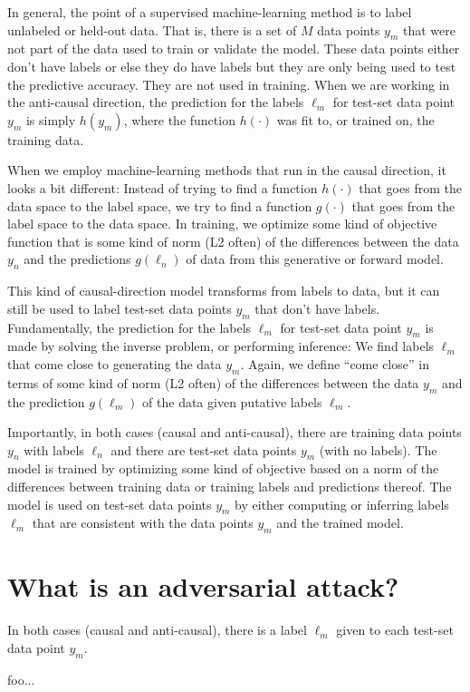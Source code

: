 \documentclass[12pt, letterpaper]{article}
\begin{document}
In general, the point of a supervised machine-learning method is to
label unlabeled or held-out data.
That is, there is a set of $M$ data points $y_m$ that were not part of
the data used to train or validate the model.
These data points either don't have labels or else they do have labels
but they are only being used to test the predictive accuracy.
They are not used in training.
When we are working in the anti-causal direction, the prediction for
the labels $\ell_m$ for test-set data point $y_m$ is simply $h(y_m)$,
where the function $h(\cdot)$ was fit to, or trained on, the training
data.

When we employ machine-learning methods that run in the causal
direction, it looks a bit different:
Instead of trying to find a function $h(\cdot)$ that goes from the
data space to the label space, we try to find a function $g(\cdot)$
that goes from the label space to the data space.
In training, we optimize some kind of objective function
that is some kind of norm (L2 often) of the differences
between the data $y_n$ and the predictions $g(\ell_n)$ of data
from this generative or forward model.

This kind of causal-direction model transforms from labels to data,
but it can still be used to label test-set data points $y_m$ that
don't have labels.
Fundamentally, the prediction for the labels $\ell_m$ for test-set
data point $y_m$ is made by solving the inverse problem, or performing
inference:
We find labels $\ell_m$ that come close to generating the data $y_m$.
Again, we define ``come close'' in terms of some kind of norm (L2
often) of the differences between the data $y_m$ and the prediction
$g(\ell_m)$ of the data given putative labels $\ell_m$.

Importantly, in both cases (causal and anti-causal), there are training
data points $y_n$ with labels $\ell_n$ and there are test-set data points
$y_m$ (with no labels).
The model is trained by optimizing some kind of objective based on a
norm of the differences between training data or training labels and
predictions thereof.
The model is used on test-set data points $y_m$ by either computing or
inferring labels $\ell_m$ that are consistent with the data points
$y_m$ and the trained model.

\section{What is an adversarial attack?}

In both cases (causal and anti-causal), there is a label $\ell_m$ given
to each test-set data point $y_m$.



foo...
\end{document}
